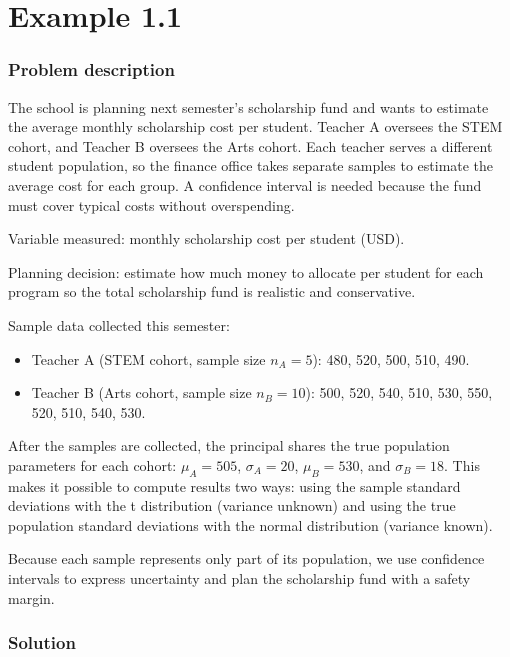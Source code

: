 \chapter{Example 1.1}\label{sec:interval-example1-1}

\subsection{Problem description}\label{subsec:interval-example1-1-problem}

The school is planning next semester's scholarship fund and wants to estimate the average monthly scholarship cost per student. Teacher A oversees the STEM cohort, and Teacher B oversees the Arts cohort. Each teacher serves a different student population, so the finance office takes separate samples to estimate the average cost for each group. A confidence interval is needed because the fund must cover typical costs without overspending.

Variable measured: monthly scholarship cost per student (USD).

Planning decision: estimate how much money to allocate per student for each program so the total scholarship fund is realistic and conservative.

Sample data collected this semester:

\begin{itemize}
	\item Teacher A (STEM cohort, sample size \(n_A = 5\)): 480, 520, 500, 510, 490.
	\item Teacher B (Arts cohort, sample size \(n_B = 10\)): 500, 520, 540, 510, 530, 550, 520, 510, 540, 530.
\end{itemize}

After the samples are collected, the principal shares the true population parameters for each cohort: \(\mu_A = 505\), \(\sigma_A = 20\), \(\mu_B = 530\), and \(\sigma_B = 18\). This makes it possible to compute results two ways: using the sample standard deviations with the t distribution (variance unknown) and using the true population standard deviations with the normal distribution (variance known).

Because each sample represents only part of its population, we use confidence intervals to express uncertainty and plan the scholarship fund with a safety margin.

\subsection{Solution}\label{subsec:interval-example1-1-solution}


